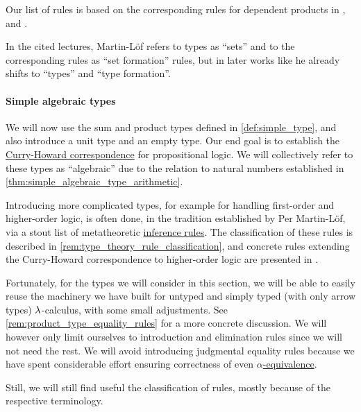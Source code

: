 \begin{comments}
  \item Our list of rules is based on the corresponding rules for dependent products in , \cite[\S A.2.4]{UnivalentFoundationsProgram2024OctoberHoTT} and \cite[\S 8.1.10]{Mimram2020ProgramEqualsProof}.

  \item In the cited lectures, Martin-L\"of refers to types as \enquote{sets} and to the corresponding rules as \enquote{set formation} rules, but in later works like \cite{MartinLöf1994TypeJudgments} he already shifts to \enquote{types} and \enquote{type formation}.
\end{comments}

\paragraph{Simple algebraic types}

\begin{remark}\label{rem:extended_simple_type_theory}
  We will now use the sum and product types defined in \cref{def:simple_type}, and also introduce a unit type and an empty type. Our end goal is to establish the \hyperref[con:curry_howard_correspondence]{Curry-Howard correspondence} for propositional logic. We will collectively refer to these types as \enquote{algebraic} due to the relation to natural numbers established in \cref{thm:simple_algebraic_type_arithmetic}.

  Introducing more complicated types, for example for handling first-order and higher-order logic, is often done, in the tradition established by Per Martin-L\"of, via a stout list of metatheoretic \hyperref[def:inference_rule]{inference rules}. The classification of these rules is described in \cref{rem:type_theory_rule_classification}, and concrete rules extending the Curry-Howard correspondence to higher-order logic are presented in .

  Fortunately, for the types we will consider in this section, we will be able to easily reuse the machinery we have built for untyped and simply typed (with only arrow types) \( {\mathrm \lambda} \)-calculus, with some small adjustments. See \cref{rem:product_type_equality_rules} for a more concrete discussion. We will however only limit ourselves to introduction and elimination rules since we will not need the rest. We will avoid introducing judgmental equality rules because we have spent considerable effort ensuring correctness of even \hyperref[def:lambda_term_alpha_equivalence]{\( \alpha \)-equivalence}.

  Still, we will still find useful the classification of rules, mostly because of the respective terminology.
\end{remark}

